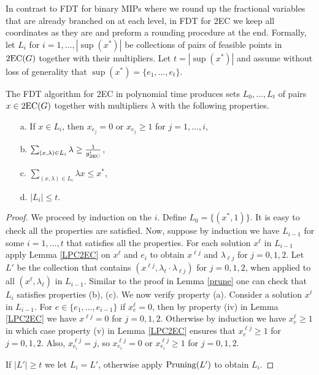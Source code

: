 \documentclass[runningheads]{llncs}
\begin{document}
In contrast to FDT for binary MIPs where we round up the fractional variables that are already branched on at each level, in FDT for 2EC we keep all coordinates as they are and preform a rounding procedure at the end. Formally, let $L_i$ for $i=1,\ldots,|\sup(x^*)|$ be collections of pairs of feasible points in $\operatorname{2EC}(G)$ together with their multipliers. Let $t=|\sup(x^*)|$ and assume without loss of generality that $\sup(x^*)=\{e_1,\ldots,e_t\}$. 

\begin{lemma}\label{2ecpruning}
	The FDT algorithm for 2EC in  polynomial time produces sets $L_0,\ldots,L_t$ of pairs $x\in \operatorname{2EC}(G)$ together with multipliers $\lambda$ with the following properties.
	\begin{enumerate}
		\item[a.] If $x\in L_i$, then $x_{e_j}=0$ or $x_{e_j}\geq 1$ for $j=1,\ldots,i$,
		\item [b.] $\sum_{(x,\lambda)\in L_i }\lambda \geq \frac{1}{g_{\operatorname{2EC}}^i}$,
		\item[c.]  $\sum_{(x,\lambda)\in L_i }\lambda x \leq x^*$,
		\item[d.] $|L_i|\leq t$.
	\end{enumerate}
\end{lemma}
\begin{proof}
	We proceed by induction on the $i$. Define $L_0=\{(x^*,1)\}$. It is easy to check all the properties are satisfied. Now, suppose by induction we have $L_{i-1}$ for some $i=1,\ldots,t$ that satisfies all the properties. For each solution $x^\ell$ in $L_{i-1}$ apply Lemma \ref{LPC2EC} on $x^\ell$ and $e_{i}$ to obtain $x^{\ell j}$ and $\lambda_{\ell j}$ for $j=0,1,2$. Let $L'$ be the collection that contains $(x^{\ell j},\lambda_\ell \cdot \lambda_{\ell j})$ for $j=0,1,2$, when applied to all $(x^\ell,\lambda_\ell)$ in $L_{i-1}$. Similar to the proof in Lemma \ref{prune} one can check that $L_i$ satisfies properties (b), (c). We now verify property (a). Consider a solution $x^\ell$ in $L_{i-1}$. For $e\in \{e_1,\ldots,e_{i-1}\}$ if $x^\ell_e =0$, then by property (iv) in Lemma \ref{LPC2EC} we have $x^{\ell j}=0$ for $j=0,1,2$. Otherwise by induction we have $x^{\ell}_{e}\geq 1$ in which case property (v) in Lemma \ref{LPC2EC} ensures that $x^{\ell j}_e\geq 1$ for $j=0,1,2$. Also, $x^{\ell j}_{e_i}= j$, so $x^{\ell j}_{e_i}=0$ or $x^{\ell j}_{e_i}\geq 1$ for $j=0,1,2$. 
	
	If $|L'|\geq t$ we let $L_i=L'$, otherwise apply $\operatorname{Pruning}(L')$ to obtain $L_{i}$.
\end{proof}	
\end{document}
